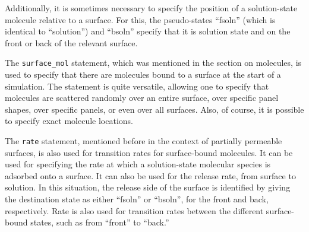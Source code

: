\documentclass {book}
\newcommand {\ttt} {\texttt}
\begin{document}
Additionally, it is sometimes necessary to specify the position of a solution-state molecule relative to a surface. For this, the pseudo-states ``fsoln'' (which is identical to ``solution'') and ``bsoln'' specify that it is solution state and on the front or back of the relevant surface.

The \ttt{surface\_mol} statement, which was mentioned in the section on molecules, is used to specify that there are molecules bound to a surface at the start of a simulation. The statement is quite versatile, allowing one to specify that molecules are scattered randomly over an entire surface, over specific panel shapes, over specific panels, or even over all surfaces. Also, of course, it is possible to specify exact molecule locations.

The \ttt{rate} statement, mentioned before in the context of partially permeable surfaces, is also used for transition rates for surface-bound molecules. It can be used for specifying the rate at which a solution-state molecular species is adsorbed onto a surface. It can also be used for the release rate, from surface to solution. In this situation, the release side of the surface is identified by giving the destination state as either ``fsoln'' or ``bsoln'', for the front and back, respectively. Rate is also used for transition rates between the different surface-bound states, such as from ``front'' to ``back.''
\end{document}
